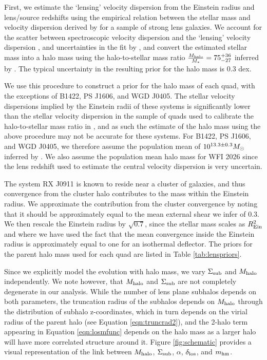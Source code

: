 First, we estimate the `lensing' velocity dispersion from the Einstein radius and lens/source redshifts using the empirical relation between the stellar mass and velocity dispersion derived by \cite{Auger++10} for a sample of strong lens galaxies. We account for the scatter between spectroscopic velocity dispersion and the `lensing' velocity dispersion \cite{Treu++06}, and uncertainties in the fit by \cite{Auger++10}, and convert the estimated stellar mass into a halo mass using the halo-to-stellar mass ratio $\frac{M_{\rm{halo}}}{M_{*}} = 75_{-27}^{+36}$ inferred by \cite{Lagattuta++10}. The typical uncertainty in the resulting prior for the halo mass is 0.3 dex. 

We use this procedure to construct a prior for the halo mass of each quad, with the exceptions of B1422, PS J1606, and WGD J0405. The stellar velocity dispersions implied by the Einstein radii of these systems is significantly lower than the stellar velocity dispersion in the sample of quads used to calibrate the halo-to-stellar mass ratio in \cite{Lagattuta++10}, and as such the estimate of the halo mass using the above procedure may not be accurate for these systems. For B1422, PS J1606, and WGD J0405, we therefore assume the population mean of $10^{13.3 \pm 0.3} {M_{\odot}}$ inferred by \cite{Lagattuta++10}. We also assume the population mean halo mass for WFI 2026 since the lens redshift used to estimate the central velocity dispersion is very uncertain. 

The system RX J0911 is known to reside near a cluster of galaxies, and thus convergence from the cluster halo contributes to the mass within the Einstein radius. We approximate the contribution from the cluster convergence by noting that it should be approximately equal to the mean external shear we infer of 0.3. We then rescale the Einstein radius by $\sqrt{0.7}$, since the stellar mass scales as $R_{\rm{Ein}}^2$ and where we have used the fact that the mean convergence inside the Einstein radius is approximately equal to one for an isothermal deflector. The priors for the parent halo mass used for each quad are listed in Table \ref{tab:lenspriors}.  

Since we explicitly model the evolution with halo mass, we vary $\Sigma_{\rm{sub}}$ and $M_{\rm{halo}}$ independently. We note however, that $M_{\rm{halo}}$ and $\Sigma_{\rm{sub}}$ are not completely degenerate in our analysis. While the number of lens plane subhalos depends on both parameters, the truncation radius of the subhalos depends on $M_{\rm{halo}}$ through the distribution of subhalo z-coordinates, which in turn depends on the virial radius of the parent halo (see Equation \ref{eqn:truncrad2}), and the 2-halo term appearing in Equation \ref{eqn:losmfunc} depends on the halo mass as a larger halo will have more correlated structure around it. Figure \ref{fig:schematic} provides a visual representation of the link between $M_{\rm{halo}}$, $\Sigma_{\rm{sub}}$, $\alpha$, $\delta_{\rm{los}}$, and ${m_{\rm{hm}}}$. 

